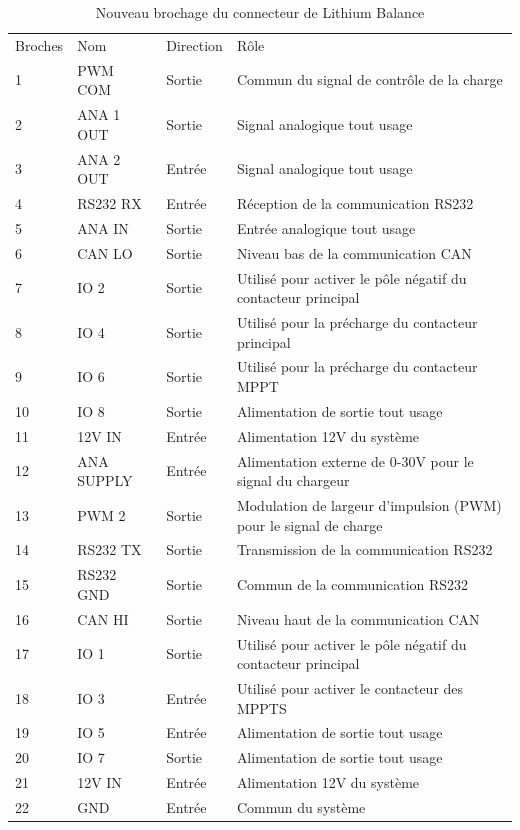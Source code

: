 		\begin{table}[H]
			\centering
			\caption{Nouveau brochage du connecteur de Lithium Balance}
			\label{22CBmsEclipse}	
			
			\begin{tabular}{ | l | l | l | l | }
				\hline
				Broches & Nom & Direction & Rôle \\ \hhline{|=|=|=|=|}
				1 & PWM COM & Sortie & Commun du signal de contrôle de la charge \\ \hline
				2 & ANA 1 OUT & Sortie & Signal analogique tout usage \\ \hline
				3 & ANA 2 OUT & Entrée & Signal analogique tout usage \\ \hline
				4 & RS232 RX & Entrée & Réception de la communication RS232 \\ \hline
				5 & ANA IN & Sortie & Entrée analogique tout usage \\ \hline
				6 & CAN LO & Sortie & Niveau bas de la communication CAN \\ \hline
				7 & IO 2 & Sortie & Utilisé pour activer le pôle négatif du contacteur principal \\ \hline
				8 & IO 4 & Sortie & Utilisé pour la précharge du contacteur principal \\ \hline
				9 & IO 6 & Sortie & Utilisé pour la précharge du contacteur MPPT \\ \hline
				10 & IO 8 & Sortie & Alimentation de sortie tout usage \\ \hline
				11 & 12V IN & Entrée & Alimentation 12V du système \\ \hline
				12 & ANA SUPPLY & Entrée & Alimentation externe de 0-30V pour le signal du chargeur \\ \hline
				13 & PWM 2 & Sortie & Modulation de largeur d'impulsion (PWM) pour le signal de charge \\ \hline
				14 & RS232 TX & Sortie & Transmission de la communication RS232 \\ \hline
				15 & RS232 GND & Sortie & Commun de la communication RS232 \\ \hline
				16 & CAN HI & Sortie & Niveau haut de la communication CAN \\ \hline
				17 & IO 1  & Sortie & Utilisé pour activer le pôle négatif du contacteur principal \\ \hline
				18 & IO 3 & Entrée & Utilisé pour activer le contacteur des MPPTS \\ \hline
				19 & IO 5 & Entrée & Alimentation de sortie tout usage \\ \hline
				20 & IO 7 & Sortie & Alimentation de sortie tout usage \\ \hline
				21 & 12V IN & Entrée & Alimentation 12V du système \\ \hline
				22 & GND & Entrée & Commun du système \\ \hline
			\end{tabular}	
		\end{table}
